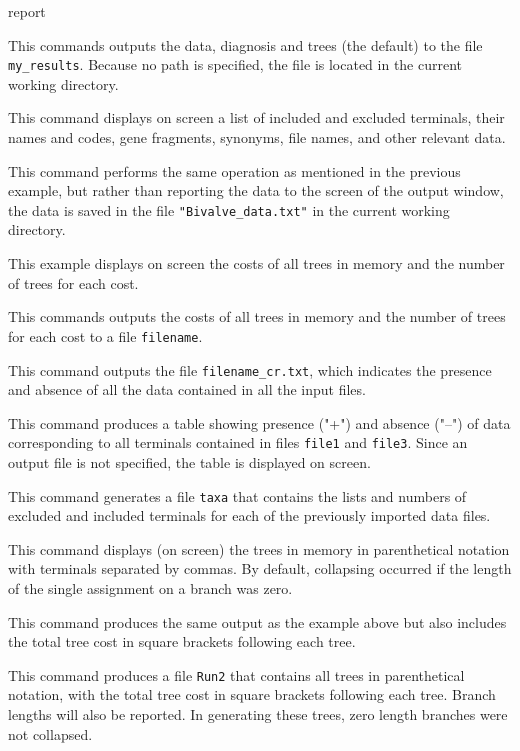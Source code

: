 \begin{command}{report}{}
\begin{poyexamples}
{This commands outputs the data, diagnosis and trees (the default) to the
file \texttt{my\_results}. Because no path is specified, the
file is located in the current working directory.}

{This command displays on screen a list of included and excluded terminals, their
names and codes, gene fragments, synonyms, file names, and other relevant data.}

{This command performs the same operation as mentioned in the previous example,
but rather than reporting the data to the screen of the output window, the data
is saved in the file \texttt{"Bivalve\_data.txt"} in the current working directory.}

{This example displays on screen the costs of all trees in memory and the
number of trees for each cost.}

{This commands outputs the costs of all trees in memory and the
number of trees for each cost to a file \texttt{filename}.}

{This command outputs the file \texttt{filename\_cr.txt}, which indicates 
the presence and absence of all the data contained in all the input files.}

{This command produces a table showing presence ("+")
and absence ("--") of data corresponding to all terminals contained
in files \texttt{file1} and \texttt{file3}. Since an output
file is not specified, the table is displayed on screen.}

{This command generates a file \texttt{taxa} that contains the
lists and numbers of excluded and included terminals for each of the previously
imported data files.}

{This command displays (on screen) the trees in memory in parenthetical
notation with terminals separated by commas. By default, collapsing 
occurred if the length of the single assignment on a branch was zero.}

{This command produces the same output as the example above
but also includes the total tree cost in square brackets
following each tree.}

{This command produces a file \texttt{Run2} that contains
all trees in parenthetical notation, with the total tree cost in square brackets 
following each tree. Branch lengths will also be reported.  In generating 
these trees, zero length branches were not collapsed.}


\end{poyexamples}
\end{command}
